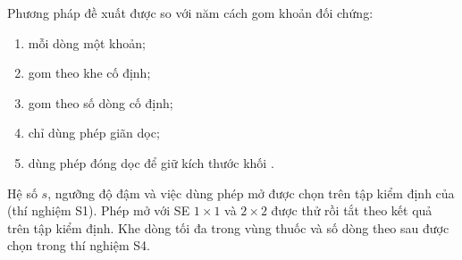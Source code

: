 Phương pháp đề xuất được so với năm cách gom khoản đối chứng:
\begin{enumerate}[label=(\alph*)]
  \item mỗi dòng một khoản;
  \item gom theo khe cố định;
  \item gom theo số dòng cố định;
  \item chỉ dùng phép giãn dọc;
  \item[(f)] dùng phép đóng dọc để giữ kích thước khối .
\end{enumerate}
Hệ số $s$, ngưỡng độ đậm và việc dùng phép mở được chọn trên tập kiểm định của  (thí nghiệm S1).
Phép mở với SE $1\times1$ và $2\times2$ được thử rồi tắt theo kết quả trên tập kiểm định.
Khe dòng tối đa trong vùng thuốc và số dòng theo sau được chọn trong thí nghiệm S4.
